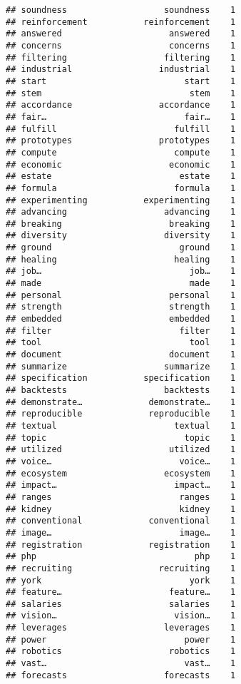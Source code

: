 \documentclass[]{article}
\begin{document}
\begin{verbatim}
## soundness                   soundness    1
## reinforcement           reinforcement    1
## answered                     answered    1
## concerns                     concerns    1
## filtering                   filtering    1
## industrial                 industrial    1
## start                           start    1
## stem                             stem    1
## accordance                 accordance    1
## fair…                           fair…    1
## fulfill                       fulfill    1
## prototypes                 prototypes    1
## compute                       compute    1
## economic                     economic    1
## estate                         estate    1
## formula                       formula    1
## experimenting           experimenting    1
## advancing                   advancing    1
## breaking                     breaking    1
## diversity                   diversity    1
## ground                         ground    1
## healing                       healing    1
## job…                             job…    1
## made                             made    1
## personal                     personal    1
## strength                     strength    1
## embedded                     embedded    1
## filter                         filter    1
## tool                             tool    1
## document                     document    1
## summarize                   summarize    1
## specification           specification    1
## backtests                   backtests    1
## demonstrate…             demonstrate…    1
## reproducible             reproducible    1
## textual                       textual    1
## topic                           topic    1
## utilized                     utilized    1
## voice…                         voice…    1
## ecosystem                   ecosystem    1
## impact…                       impact…    1
## ranges                         ranges    1
## kidney                         kidney    1
## conventional             conventional    1
## image…                         image…    1
## registration             registration    1
## php                               php    1
## recruiting                 recruiting    1
## york                             york    1
## feature…                     feature…    1
## salaries                     salaries    1
## vision…                       vision…    1
## leverages                   leverages    1
## power                           power    1
## robotics                     robotics    1
## vast…                           vast…    1
## forecasts                   forecasts    1

\end{verbatim}
\end{document}
